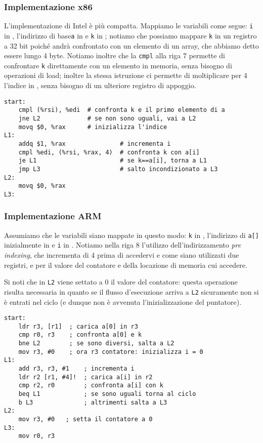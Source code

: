\documentclass[class=book, crop=false, oneside]{standalone}
\begin{document}
\subsubsection{Implementazione x86}
L'implementazione di Intel è più compatta. Mappiamo le variabili come segue: \texttt{i} in , l'indirizzo di base\texttt{a} in  e \texttt{k} in ; notiamo che possiamo mappare \texttt{k} in un registro a 32 bit poiché andrà confrontato con un elemento di un array, che abbiamo detto essere lungo 4 byte.
Notiamo inoltre che la \texttt{cmpl} alla riga \(7\) permette di confrontare \texttt{k} direttamente con un elemento in memoria, senza bisogno di operazioni di load; inoltre la stessa istruzione ci permette di moltiplicare per 4 l'indice in , senza bisogno di un ulteriore registro di appoggio.
\begin{verbatim}
start:
	cmpl (%rsi), %edi  # confronta k e il primo elemento di a
	jne L2             # se non sono uguali, vai a L2
	movq $0, %rax      # inizializza l'indice
L1:
	addq $1, %rax               # incrementa i
	cmpl %edi, (%rsi, %rax, 4)  # confronta k con a[i]
	je L1                       # se k==a[i], torna a L1
	jmp L3                      # salto incondizionato a L3
L2:
	movq $0, %rax
L3:
\end{verbatim}

\subsubsection{Implementazione ARM}
Assumiamo che le variabili siano mappate in questo modo: \texttt{k} in , l'indirizzo di \texttt{a[]} inizialmente in  e \texttt{i} in . Notiamo nella riga 8 l'utilizzo dell'indirizzamento \emph{pre indexing}, che incrementa  di 4 prima di accedervi e come siano utilizzati due registri,  e  per il valore del contatore e della locazione di memoria cui accedere.

Si noti che in \texttt{L2} viene settato a 0 il valore del contatore: questa operazione risulta necessaria in quanto se il flusso d'esecuzione arriva a \texttt{L2} sicuramente non si è entrati nel ciclo (e dunque non è avvenuta l'inizializzazione del puntatore).
\begin{verbatim}
start:
	ldr r3, [r1]  ; carica a[0] in r3
	cmp r0, r3    ; confronta a[0] e k
	bne L2        ; se sono diversi, salta a L2
	mov r3, #0    ; ora r3 contatore: inizializza i = 0
L1:
	add r3, r3, #1    ; incrementa i
	ldr r2 [r1, #4]!  ; carica a[i] in r2
	cmp r2, r0        ; confronta a[i] con k
	beq L1            ; se sono uguali torna al ciclo
	b L3              ; altrimenti salta a L3
L2:
	mov r3, #0   ; setta il contatore a 0
L3:
	mov r0, r3
\end{verbatim}
\end{document}
